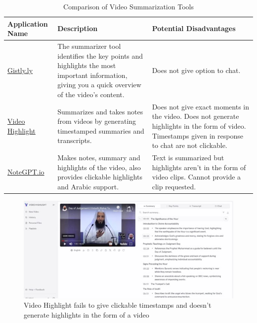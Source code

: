 \documentclass{bscs}
\begin{document}
\begin{table}[h]
    \centering
    \begin{tabular}{|p{3cm}|p{7cm}|p{6cm}|}
        \hline
        \textbf{Application Name} & \textbf{Description} & \textbf{Potential Disadvantages} \\
        \hline
        \href{https://gistly.ly}{Gistly.ly} & The summarizer tool identifies the key points and highlights the most important information, giving you a quick overview of the video’s content. & Does not give option to chat. \\
        \hline
        \href{https://videohighlight.com}{Video Highlight} & Summarizes and takes notes from videos by generating timestamped summaries and transcripts. & Does not give exact moments in the video. Does not generate highlights in the form of video. Timestamps given in response to chat are not clickable. \\
        \hline
        \href{https://notegpt.io}{NoteGPT.io} & Makes notes, summary and highlights of the video, also provides clickable highlights and Arabic support. & Text is summarized but highlights aren’t in the form of video clips. Cannot provide a clip requested. \\
        \hline
    \end{tabular}
    \caption{Comparison of Video Summarization Tools}
\end{table}

\begin{figure}[p]
    \centering
    \includegraphics[width=1.1\textwidth]{figure_a.jpg}  
    \caption{Video Highlight fails to give clickable timestamps and doesn’t generate highlights in the form of a video}
    \label{fig:figure1} 
\end{figure}
\end{document}
